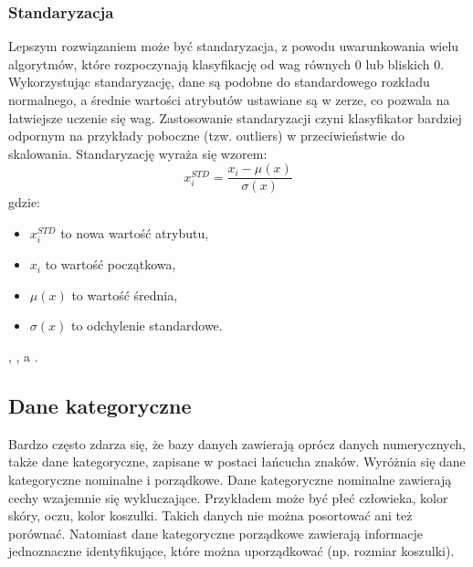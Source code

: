 \subsubsection{Standaryzacja}
Lepszym rozwiązaniem może być standaryzacja, z powodu uwarunkowania wielu algorytmów, które rozpoczynają klasyfikację od wag równych 0 lub bliskich 0. Wykorzystując standaryzację, dane są podobne do standardowego rozkładu normalnego, a średnie wartości atrybutów ustawiane są w zerze, co pozwala na łatwiejsze uczenie się wag. Zastosowanie standaryzacji czyni klasyfikator bardziej odpornym na przykłady poboczne (tzw. outliers) w przeciwieństwie do skalowania. Standaryzację wyraża się wzorem:
\[x_i^{STD} = \frac{x_i - \mu(x)}{\sigma(x)}\]
gdzie:
\begin{itemize}
	\item $x_i^{STD}$ to nowa wartość atrybutu,
	\item $x_i$ to wartość początkowa,
	\item $\mu(x)$ to wartość średnia,
	\item $\sigma(x)$ to odchylenie standardowe.
\end{itemize} ,  , a .
\subsection{Dane kategoryczne}
Bardzo często zdarza się, że bazy danych zawierają oprócz danych numerycznych, także dane kategoryczne, zapisane w postaci łańcucha znaków. Wyróżnia się dane kategoryczne nominalne i porządkowe. Dane kategoryczne nominalne zawierają cechy wzajemnie się wykluczające. Przykładem może być płeć człowieka, kolor skóry, oczu, kolor koszulki. Takich danych nie można posortować ani też porównać. Natomiast dane kategoryczne porządkowe zawierają informacje jednoznaczne identyfikujące, które można uporządkować (np. rozmiar koszulki).
